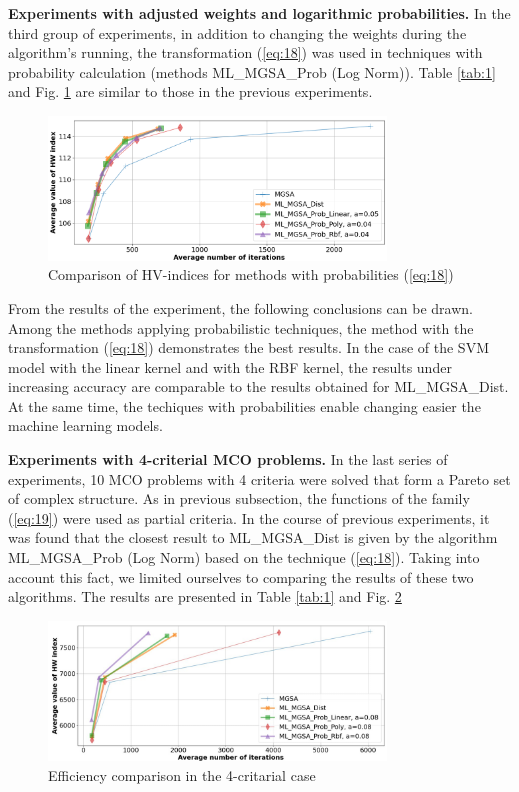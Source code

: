 \documentclass[runningheads]{llncs}
\begin{document}
\textbf{Experiments with adjusted weights and logarithmic probabilities.} In the third group of experiments, in addition to changing the weights during the algorithm’s running, the transformation (\ref{eq:18}) was used in techniques with probability calculation (methods ML\_MGSA\_Prob (Log Norm)). Table \ref{tab:1} and Fig. \ref{fig:5} are similar to those in the previous experiments.

\begin{figure}
\centering
\includegraphics[width=0.8\textwidth]{fig5.png}
\caption{Comparison of  HV-indices for methods with probabilities (\ref{eq:18})} 
\label{fig:5}
\end{figure}

From the results of the experiment, the following conclusions can be drawn. Among the methods applying probabilistic techniques, the method with the transformation (\ref{eq:18}) demonstrates the best results. In the case of the SVM model with the linear kernel and with the RBF kernel, the results under increasing accuracy are comparable to the results obtained for ML\_MGSA\_Dist. At the same time, the techiques with probabilities enable changing easier the machine learning models. 

\textbf{Experiments with 4-criterial MCO problems.} In the last series of experiments, 10 MCO problems with 4 criteria were solved that form a Pareto set of complex structure. As in previous subsection, the functions of the family (\ref{eq:19}) were used as partial criteria. In the course of previous experiments, it was found that the closest result to ML\_MGSA\_Dist is given by the algorithm ML\_MGSA\_Prob (Log Norm) based on the technique (\ref{eq:18}). Taking into account this fact, we limited ourselves to comparing the results of these two algorithms. The results are presented in Table \ref{tab:1} and Fig. \ref{fig:6}

\begin{figure}
\centering
\includegraphics[width=0.8\textwidth]{Fig6.png}
\caption{Efficiency comparison in the 4-critarial case} 
\label{fig:6}
\end{figure}
\end{document}
